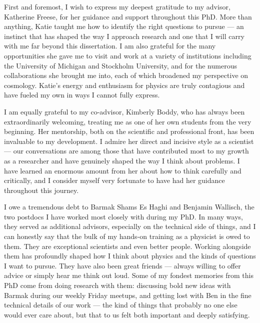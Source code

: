 \begin{acknowledgments}

First and foremost, I wish to express my deepest gratitude to my advisor, Katherine Freese, for her guidance and support throughout this PhD. More than anything, Katie taught me how to identify the right questions to pursue — an instinct that has shaped the way I approach research and one that I will carry with me far beyond this dissertation. I am also grateful for the many opportunities she gave me to visit and work at a variety of institutions including the University of Michigan and Stockholm University, and for the numerous collaborations she brought me into, each of which broadened my perspective on cosmology. Katie's energy and enthusiasm for physics are truly contagious and have fueled my own in ways I cannot fully express.


I am equally grateful to my co-advisor, Kimberly Boddy, who has always been extraordinarily welcoming, treating me as one of her own students from the very beginning. Her mentorship, both on the scientific and professional front, has been invaluable to my development. I admire her direct and incisive style as a scientist — our conversations are among those that have contributed most to my growth as a researcher and have genuinely shaped the way I think about problems. I have learned an enormous amount from her about how to think carefully and critically, and I consider myself very fortunate to have had her guidance throughout this journey.

I owe a tremendous debt to Barmak Shams Es Haghi and Benjamin Wallisch, the two postdocs I have worked most closely with during my PhD. In many ways, they served as additional advisors, especially on the technical side of things, and I can honestly say that the bulk of my hands-on training as a physicist is owed to them. They are exceptional scientists and even better people. Working alongside them has profoundly shaped how I think about physics and the kinds of questions I want to pursue. They have also been great friends — always willing to offer advice or simply hear me think out loud. Some of my fondest memories from this PhD come from doing research with them: discussing bold new ideas with Barmak during our weekly Friday meetups, and getting lost with Ben in the fine technical details of our work — the kind of things that probably no one else would ever care about, but that to us felt both important and deeply satisfying.


\end{acknowledgments}
